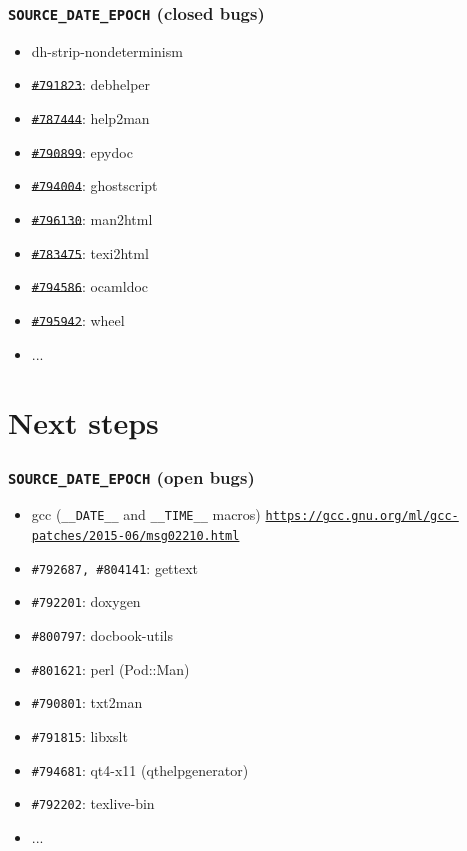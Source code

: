 \documentclass[14pt]{beamer}
\begin{document}
\begin{frame}
 \frametitle{\texttt{SOURCE\_DATE\_EPOCH} (closed bugs)}

 \begin{itemize}
  \item dh-strip-nondeterminism
  \item \sout{\texttt{\#791823}}: debhelper
  \item \sout{\texttt{\#787444}}: help2man
  \item \sout{\texttt{\#790899}}: epydoc
  \item \sout{\texttt{\#794004}}: ghostscript
  \item \sout{\texttt{\#796130}}: man2html
  \item \sout{\texttt{\#783475}}: texi2html
  \item \sout{\texttt{\#794586}}: ocamldoc
  \item \sout{\texttt{\#795942}}: wheel
  \item ...
 \end{itemize}
\end{frame}


\section{Next steps}


\begin{frame}
 \frametitle{\texttt{SOURCE\_DATE\_EPOCH} (open bugs)}

 \begin{itemize}
  \item gcc (\texttt{\_\_DATE\_\_} and \texttt{\_\_TIME\_\_} macros) \texttt{\footnotesize{\url{https://gcc.gnu.org/ml/gcc-patches/2015-06/msg02210.html}}}
  \item \texttt{\#792687, \#804141}: gettext
  \item \texttt{\#792201}: doxygen
  \item \texttt{\#800797}: docbook-utils
  \item \texttt{\#801621}: perl (Pod::Man)
  \item \texttt{\#790801}: txt2man
  \item \texttt{\#791815}: libxslt
  \item \texttt{\#794681}: qt4-x11 (qthelpgenerator)
  \item \texttt{\#792202}: texlive-bin
  \item ...
 \end{itemize}

\end{frame}
\end{document}
